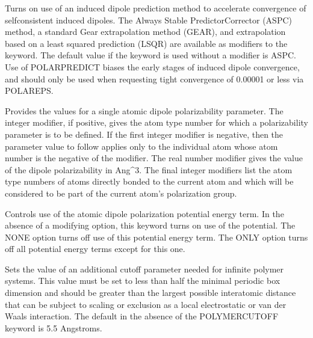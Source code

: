 \documentclass[letterpaper,11pt,english]{sphinxmanual}
\begin{document}
  Turns on use of an induced dipole prediction method to accelerate convergence of self\sphinxhyphen{}consistent induced dipoles. The Always Stable Predictor\sphinxhyphen{}Corrector (ASPC) method, a standard Gear extrapolation method (GEAR), and extrapolation based on a least squared prediction (LSQR) are available as modifiers to the keyword. The default value if the keyword is used without a modifier is ASPC. Use of POLAR\sphinxhyphen{}PREDICT biases the early stages of induced dipole convergence, and should only be used when requesting tight convergence of 0.00001 or less via POLAR\sphinxhyphen{}EPS.



  Provides the values for a single atomic dipole polarizability parameter. The integer modifier, if positive, gives the atom type number for which a polarizability parameter is to be defined. If the first integer modifier is negative, then the parameter value to follow applies only to the individual atom whose atom number is the negative of the modifier. The real number modifier gives the value of the dipole polarizability in Ang\textasciicircum{}3. The final integer modifiers list the atom type numbers of atoms directly bonded to the current atom and which will be considered to be part of the current atom’s polarization group.

  Controls use of the atomic dipole polarization potential energy term. In the absence of a modifying option, this keyword turns on use of the potential. The NONE option turns off use of this potential energy term. The ONLY option turns off all potential energy terms except for this one.

  Sets the value of an additional cutoff parameter needed for infinite polymer systems. This value must be set to less than half the minimal periodic box dimension and should be greater than the largest possible interatomic distance that can be subject to scaling or exclusion as a local electrostatic or van der Waals interaction. The default in the absence of the POLYMER\sphinxhyphen{}CUTOFF keyword is 5.5 Angstroms.

\end{document}
